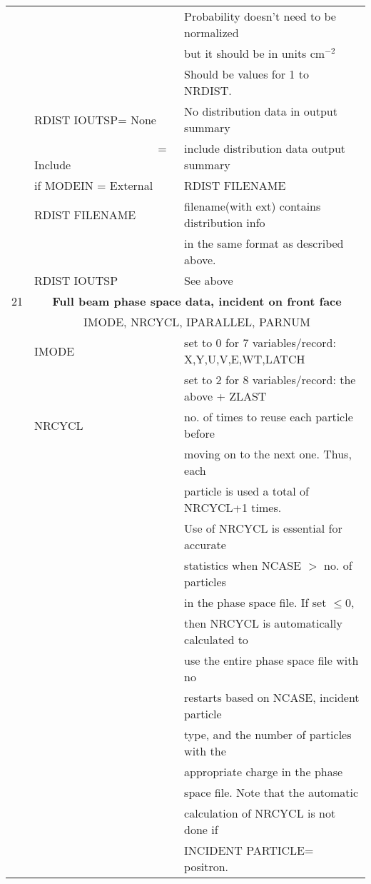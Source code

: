 \begin{longtable}{lll}
  &              & Probability doesn't need to be normalized\\
  &              & but it should be in units cm$^{-2}$ \\
  &              & Should be values for 1 to NRDIST.\\
  & RDIST IOUTSP= None & No distribution data in output summary\\
  & ~~~~~~~~~~~~~~~~~~~~~ = Include & include distribution data output summary\\
  &if MODEIN = External & RDIST FILENAME \\
  & RDIST FILENAME     & filename(with ext) contains  distribution info\\
  &                   & in the same format as described above.\\
  & RDIST IOUTSP & See above\\
\hline
21&\multicolumn{2}{c}{\bf Full beam phase space data, incident on front face}\\
  &\multicolumn{2}{c}{IMODE, NRCYCL, IPARALLEL, PARNUM}\\
  & IMODE & set to 0 for 7 variables/record: X,Y,U,V,E,WT,LATCH \\
  &  & set to 2 for 8 variables/record: the above + ZLAST \\
  & NRCYCL  & no. of times to reuse each particle before\\
  &         & moving on to the next one.  Thus, each\\
  &         & particle is used a total of NRCYCL+1 times.\\
  &         &  Use of NRCYCL is essential for accurate\\
  &         & statistics when NCASE $>$ no. of particles\\
  &         & in the phase space file.  If set $\leq$0,\\
  &         & then NRCYCL is automatically calculated to\\
  &         & use the entire phase space file with no\\
  &         & restarts based on NCASE, incident particle\\
  &         & type, and the number of particles with the\\
  &         & appropriate charge in the phase\\
  &         & space file.  Note that the automatic\\
  &         & calculation of NRCYCL is not done if\\
  &         & INCIDENT PARTICLE= positron.\\

\end{longtable}
